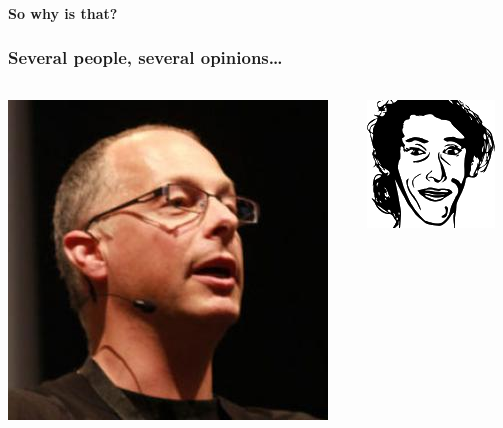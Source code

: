 \documentclass[xcolor=dvipsnames]{beamer}
\begin{document}
\begin{frame}
\frametitle{}
{\Large \bf So why is that?}
\end{frame}

\begin{frame}
\frametitle{Several people, several opinions\dots}
\begin{columns}
\begin{column}{0.3\linewidth}
\includegraphics[width=0.9\linewidth]{figures/pieter_hintjens.jpg}
\end{column}

\begin{column}{0.3\linewidth}
\includegraphics[width=0.9\linewidth]{figures/gael_varoquaux.jpg}
\end{column}


\end{columns}
\end{frame}
\end{document}
